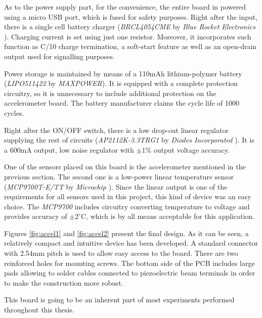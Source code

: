 \documentclass[12pt,a4paper]{article}
\begin{document}
As to the power supply part, for the convenience, the entire board in powered using a micro USB port, which is fused for safety purposes. Right after the input, there is a single cell battery charger (\textit{BRCL4054CME} by \textit{Blue Rocket Electronics} \cite{charger_params}). Charging current is set using just one resistor. Moreover, it incorporates such function as C/10 charge termination, a soft-start feature as well as an open-drain output used for signalling purposes.
\par
Power storage is maintained by means of a 110mAh lithium-polymer battery (\textit{LIPO511422} by \textit{MAXPOWER}). It is equipped with a complete protection circuitry, so it is unnecessary to include additional protection on the accelerometer board. The battery manufacturer claims the cycle life of 1000 cycles.
\par

Right after the ON/OFF switch, there is a low drop-out linear regulator supplying the rest of circuits (\textit{AP2112K-3.3TRG1} by \textit{Diodes Incorporated} \cite{ap2112_params}). It is a 600mA output, low noise regulator with $\pm{1}\%$ output voltage accuracy.
\par

One of the sensors placed on this board is the accelerometer mentioned in the previous section. The second one is a low-power linear temperature sensor (\textit{MCP9700T-E/TT} by \textit{Microchip} \cite{mcp9700_params}). Since the linear output is one of the requirements for all sensors used in this project, this kind of device was an easy choice. The \textit{MCP9700} includes circuitry converting temperature to voltage and provides accuracy of $\pm{2}^\circ $C, which is by all means acceptable for this application.
\par

Figures \ref{fig:accel1} and \ref{fig:accel2} present the final design. As it can be seen, a relatively compact and intuitive device has been developed. A standard connector with 2.54mm pitch is used to allow easy access to the board. There are two reinforced holes for mounting screws. The bottom side of the PCB includes large pads allowing to solder cables connected to piezoelectric beam terminals in order to make the construction more robust.
\par

This board is going to be an inherent part of most experiments performed throughout this thesis.
\end{document}
